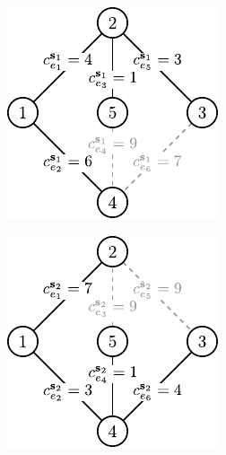 \begin{figure}[!h]
	\null\hfill
	\begin{subfigure}[b]{0.3\textwidth}
		\includegraphics[width=\textwidth]{Chapter_II/ROB-INC-MST-example/d1}
		\caption{}
		\label{fig:robincrexampleopt:a}
	\end{subfigure}
	\hfill
	\begin{subfigure}[b]{0.3\textwidth}
		\includegraphics[width=\textwidth]{Chapter_II/ROB-INC-MST-example/d2}

\end{subfigure}
\end{figure}
